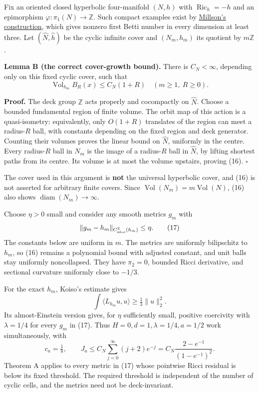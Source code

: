 \documentclass[
  11pt,
]{article}
\begin{document}
Fix an oriented closed hyperbolic four-manifold \((N,h)\) with
\(\operatorname{Ric}_h=-h\) and an epimorphism
\(\varphi:\pi_1(N)\to\mathbb Z\). Such compact examples exist by
\href{https://math.umd.edu/~jjm/papers/bettinumber.pdf}{Millson's
construction}, which gives nonzero first Betti number in every dimension
at least three. Let \((\widehat N,\widehat h)\) be the cyclic infinite
cover and \((N_m,h_m)\) its quotient by \(m\mathbb Z\).

\textbf{Lemma B (the correct cover-growth bound).} There is
\(C_N<\infty\), depending only on this fixed cyclic cover, such that \[
 \operatorname{Vol}_{h_m}B_R(x)\le C_N(1+R)
                 \quad(m\ge1,\ R\ge0).                      \tag{16}
\]

\textbf{Proof.} The deck group \(\mathbb Z\) acts properly and
cocompactly on \(\widehat N\). Choose a bounded fundamental region of
finite volume. The orbit map of this action is a quasi-isometry:
equivalently, only \(O(1+R)\) translates of the region can meet a
radius-\(R\) ball, with constants depending on the fixed region and deck
generator. Counting their volumes proves the linear bound on
\(\widehat N\), uniformly in the centre. Every radius-\(R\) ball in
\(N_m\) is the image of a radius-\(R\) ball in \(\widehat N\), by
lifting shortest paths from its centre. Its volume is at most the volume
upstairs, proving (16). \(\square\)

The cover used in this argument is \textbf{not} the universal hyperbolic
cover, and (16) is not asserted for arbitrary finite covers. Since
\(\operatorname{Vol}(N_m)=m\operatorname{Vol}(N)\), (16) also shows
\(\operatorname{diam}(N_m)\to\infty\).

Choose \(\eta>0\) small and consider any smooth metrics \(g_m\) with \[
                  \|g_m-h_m\|_{C^3_{\rm uloc}(h_m)}\le\eta.   \tag{17}
\] The constants below are uniform in \(m\). The metrics are uniformly
bilipschitz to \(h_m\), so (16) remains a polynomial bound with adjusted
constant, and unit balls stay uniformly noncollapsed. They have
\(\pi_2=0\), bounded Ricci derivative, and sectional curvature uniformly
close to \(-1/3\).

For the exact \(h_m\), Koiso's estimate gives \[
                \int\langle L_{h_m}u,u\rangle
                              \ge\tfrac13\|u\|_2^2.          \tag{18}
\] Its almost-Einstein version gives, for \(\eta\) sufficiently small,
positive coercivity with \(\lambda=1/4\) for every \(g_m\) in (17). Thus
\(H=0,d=1,\lambda=1/4,a=1/2\) work simultaneously, with \[
 c_a=\tfrac18,\qquad
 J_a\le C_N\sum_{j=0}^{\infty}(j+2)e^{-j}
        =C_N\frac{2-e^{-1}}{(1-e^{-1})^2}.                    \tag{19}
\] Theorem A applies to every metric in (17) whose pointwise Ricci
residual is below its fixed threshold. The required threshold is
independent of the number of cyclic cells, and the metrics need not be
deck-invariant.
\end{document}
